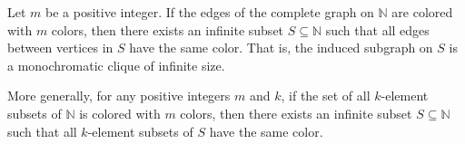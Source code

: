 \begin{theorem} \label{theorem:infinite_ramseys_theorem_for_countable_complete_graph_edge_colorings}
Let $m$ be a positive integer. If the edges of the complete graph on $\mathbb{N}$ are colored with $m$ colors, then there exists an infinite subset $S \subseteq \mathbb{N}$ such that all edges between vertices in $S$ have the same color. That is, the induced subgraph on $S$ is a monochromatic clique of infinite size.

More generally, for any positive integers $m$ and $k$, if the set of all $k$-element subsets of $\mathbb{N}$ is colored with $m$ colors, then there exists an infinite subset $S \subseteq \mathbb{N}$ such that all $k$-element subsets of $S$ have the same color.
\end{theorem}
